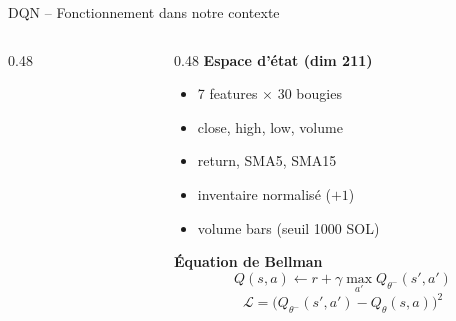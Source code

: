 \documentclass[11pt,aspectratio=169]{beamer}
\begin{document}
\begin{frame}{DQN -- Fonctionnement dans notre contexte}
\begin{columns}[T]
\begin{column}{0.48\textwidth}
\end{column}

\begin{column}{0.48\textwidth}
\small
\textbf{Espace d'état (dim 211)}

\begin{itemize}
    \item 7 features $\times$ 30 bougies
    \item close, high, low, volume
    \item return, SMA5, SMA15
    \item inventaire normalisé ($+1$)
    \item volume bars (seuil 1000 SOL)
\end{itemize}

\vspace{0.3cm}
\textbf{Équation de Bellman}
\[
Q(s,a) \leftarrow r + \gamma \max_{a'} Q_{\theta^-}(s',a')
\]
\[
\mathcal{L} = \bigl(Q_{\theta^-}(s',a')-Q_\theta(s,a)\bigr)^2
\]

\end{column}
\end{columns}

\end{frame}
\end{document}
